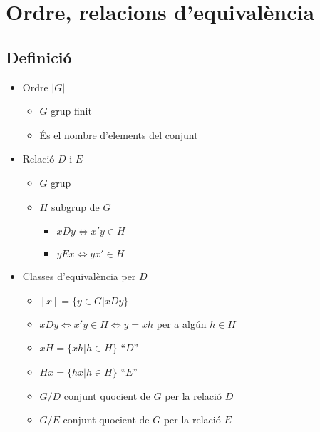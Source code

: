 \section{Ordre, relacions d'equivalència}
\subsection*{Definició}
\begin{itemize}
\item Ordre $|G|$
	\begin{itemize}
	\item $G$ grup finit
	\item És el nombre d'elements del conjunt
	\end{itemize}
\item Relació $D$ i $E$
	\begin{itemize}
	\item $G$ grup
	\item $H$ subgrup de $G$
		\begin{itemize}
		\item $xDy \Leftrightarrow x'y \in H$
		\item $yEx \Leftrightarrow yx' \in H$
		\end{itemize}
	\end{itemize}
\item Classes d'equivalència per $D$
	\begin{itemize}
	\item $[x] = \{y \in G | xDy\}$
	\item $xDy \Leftrightarrow x'y \in H \Leftrightarrow y = xh$ per a algún $h \in H$
	\item $xH = \{xh | h \in H\}$ ``$D$''
	\item $Hx = \{hx | h \in H\}$ ``$E$''
	\item $G/D$ conjunt quocient de $G$ per la relació $D$
	\item $G/E$ conjunt quocient de $G$ per la relació $E$
	\end{itemize}
\end{itemize}

